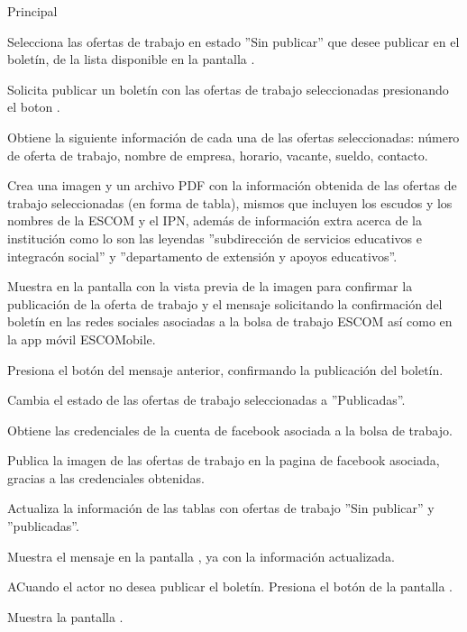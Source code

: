 	\begin{UCtrayectoria}{Principal}

		\UCpaso [\UCactor] Selecciona las ofertas de trabajo en estado ''Sin publicar'' que desee publicar en el boletín, de la lista disponible en la pantalla .

		\UCpaso[\UCactor] Solicita publicar un boletín con las ofertas de trabajo seleccionadas presionando el boton .

		\UCpaso Obtiene la siguiente información de cada una de las ofertas seleccionadas: número de oferta de trabajo, nombre de empresa, horario, vacante, sueldo, contacto.
		
		\UCpaso Crea una imagen y un archivo PDF con la información obtenida de las ofertas de trabajo seleccionadas (en forma de tabla), mismos que incluyen los escudos y los nombres de la ESCOM y el IPN, además de información extra acerca de la institución como lo son las leyendas ''subdirección de servicios educativos e integracón social'' y ''departamento de extensión y apoyos educativos''. 

		\UCpaso Muestra en la pantalla  con la vista previa de la imagen para confirmar la publicación de la oferta de trabajo y el mensaje  solicitando la confirmación del boletín en las redes sociales asociadas a la bolsa de trabajo ESCOM así como en la app móvil ESCOMobile.

		\UCpaso [\UCactor] Presiona el botón  del mensaje anterior, confirmando la publicación del boletín.  
	
		\UCpaso Cambia el estado de las ofertas de trabajo seleccionadas a ''Publicadas''.

		\UCpaso Obtiene las credenciales de la cuenta de facebook asociada a la bolsa de trabajo.

		\UCpaso Publica la imagen de las ofertas de trabajo en la pagina de facebook asociada, gracias a las credenciales obtenidas.

		\UCpaso Actualiza la información de las tablas con ofertas de trabajo ''Sin publicar'' y ''publicadas''.

		\UCpaso Muestra el mensaje  en la pantalla , ya con la información actualizada.
	
	\end{UCtrayectoria}

	\begin{UCtrayectoriaA}{A}{Cuando el actor no desea publicar el boletín.}
		\UCpaso [\UCactor] Presiona el botón   de la pantalla .

		\UCpaso Muestra la pantalla .   
	\end{UCtrayectoriaA}
